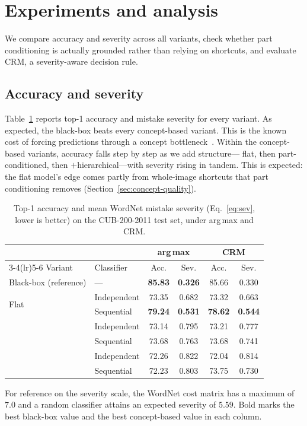 \section{Experiments and analysis}
\label{sec:experiments}
We compare accuracy and severity across all variants, check whether part
conditioning is actually grounded rather than relying on shortcuts, and
evaluate CRM, a severity-aware decision rule.

\subsection{Accuracy and severity}
Table~\ref{tab:results} reports top-1 accuracy and mistake severity for every
variant. As expected, the black-box beats every concept-based variant. This is the known cost of forcing predictions
through a concept bottleneck~\cite{koh2020concept}. Within the
concept-based variants, accuracy falls step by step as we add structure---
flat, then part-conditioned, then $+$hierarchical---with severity rising in
tandem. This is expected: the flat model's edge comes partly from
whole-image shortcuts that part conditioning removes (Section~\ref{sec:concept-quality}).

\begin{table}[h]
  \centering
  \footnotesize
  \setlength{\tabcolsep}{4pt}
  \caption{Top-1 accuracy and mean WordNet mistake severity
  (Eq.~\eqref{eq:sev}, lower is better) on the CUB-200-2011 test set, under
  arg\,max and CRM.}
  \label{tab:results}
  \begin{tabular}{llcccc}
    \toprule
    & & \multicolumn{2}{c}{arg\,max} & \multicolumn{2}{c}{CRM} \\
    \cmidrule(lr){3-4}\cmidrule(lr){5-6}
    Variant & Classifier & Acc. & Sev. & Acc. & Sev. \\
    \midrule
    Black-box (reference) & --- & \textbf{85.83} & \textbf{0.326} & 85.66 & 0.330 \\
    \midrule
    \multirow{2}{*}{Flat}
      & Independent & 73.35 & 0.682 & 73.32 & 0.663 \\
      & Sequential  & \textbf{79.24} & \textbf{0.531} & \textbf{78.62} & \textbf{0.544} \\
    \addlinespace
    \multirow{2}{*}{Part-conditioned}
      & Independent & 73.14 & 0.795 & 73.21 & 0.777 \\
      & Sequential  & 73.68 & 0.763 & 73.68 & 0.741 \\
    \addlinespace
    \multirow{2}{*}{\;+ hierarchical concepts}
      & Independent & 72.26 & 0.822 & 72.04 & 0.814 \\
      & Sequential  & 72.23 & 0.803 & 73.75 & 0.730 \\
    \bottomrule
  \end{tabular}
  \par\vspace{2pt}
  {\scriptsize For reference on the severity scale, the WordNet cost matrix has a
  maximum of $7.0$ and a random classifier attains an expected severity of $5.59$.
  Bold marks the best black-box value and the best concept-based value in each column.}
\end{table}

